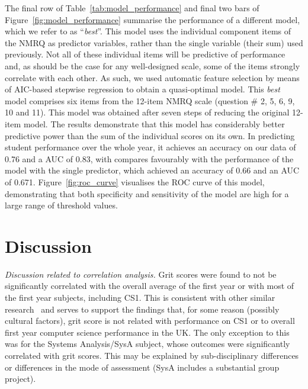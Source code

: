 \documentclass[sigconf]{acmart}
\begin{document}
The final row of Table~\ref{tab:model_performance} and final two bars of Figure~\ref{fig:model_performance} summarise the performance of a different model, which we refer to as ``{\em best}''. This model uses the individual component items of the NMRQ as predictor variables, rather than the single variable (their sum) used previously. Not all of these individual items will be predictive of performance and, as should be the case for any well-designed scale, some of the items strongly correlate with each other. As such, we used  automatic feature selection by means of AIC-based stepwise regression to obtain a quasi-optimal model. This {\em best} model comprises six items from the 12-item NMRQ scale (question \# 2, 5, 6, 9, 10 and 11). This model was obtained after seven steps of reducing the original 12-item model. The results demonstrate that this model has considerably better predictive power than the sum of the individual scores on its own. In predicting student performance over the whole year, it achieves an accuracy on our data of 0.76 and a AUC of 0.83, with compares favourably with the performance of the model with the single predictor, which achieved an accuracy of 0.66 and an AUC of 0.671. Figure~\ref{fig:roc_curve} visualises the ROC curve of this model, demonstrating that both specificity and sensitivity of the model are high for a large range of threshold values.

\section{Discussion}
{\em Discussion related to correlation analysis. }
Grit scores were found to not be significantly correlated with the overall average of the first year or with most of the first year subjects, including CS1. This is consistent with other similar research~\cite{Sigurdson:2018:EGC:3279720.3279743} and serves to support the findings that, for some reason (possibly cultural factors), grit score is not related with performance on CS1 or to overall first year computer science performance in the UK. The only exception to this was for the Systems Analysis/SysA subject, whose outcomes were significantly correlated with grit scores. This may be explained by sub-disciplinary differences or differences in the mode of assessment (SysA includes a substantial group project). 
\end{document}
